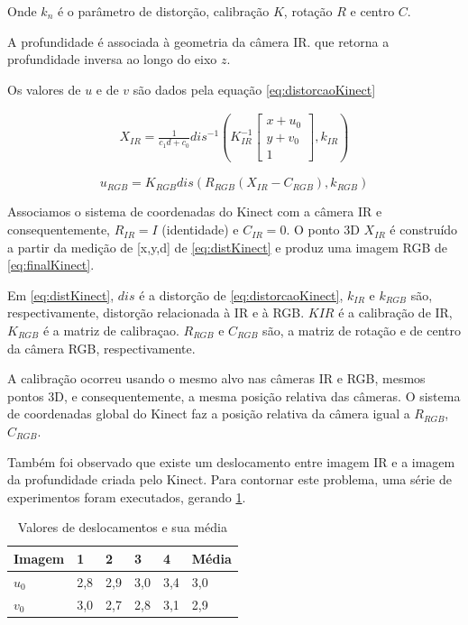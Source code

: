 Onde $k_n$ é o parâmetro de distorção, calibração $K$, rotação $R$ e centro $C$.

A profundidade é associada à geometria da câmera IR. que retorna a profundidade inversa ao longo do eixo $z$.

Os valores de $u$ e de $v$ são dados pela equação \ref{eq:distorcaoKinect} %

\begin{gather} 
X_{IR} = \frac{1}{c_1 d + c_0}dis^{-1}\left ( K^{-1}_{IR}
\begin{bmatrix}
x+u_0\\ 
y+v_0\\ 
1
\end{bmatrix},k_{IR} 
\right )
\label{eq:distKinect}
\end{gather}

\begin{equation}
\label{eq:finalKinect}
u_{RGB} = K_{RGB} dis(R_{RGB}(X_{IR} - C_{RGB}),k_{RGB})
\end{equation}

Associamos o sistema de coordenadas do Kinect com a câmera IR e consequentemente, $R_{IR} = I$ (identidade) e $C_{IR} = 0$. 
O ponto 3D $X_{IR}$ é construído a partir da medição de [x,y,d] de \ref{eq:distKinect} e produz uma imagem RGB de \ref{eq:finalKinect}.

Em \ref{eq:distKinect}, $dis$ é a distorção de \ref{eq:distorcaoKinect}, $k_{IR}$ e $k_{RGB}$ são, respectivamente, distorção relacionada à IR e à RGB. 
$K{IR}$ é a calibração de IR, $K_{RGB}$ é a matriz de calibraçao. $R_{RGB}$ e $C_{RGB}$ são, a matriz de rotação e de centro da câmera RGB, respectivamente.

A calibração ocorreu usando o mesmo alvo nas câmeras IR e RGB, mesmos pontos 3D, e consequentemente, a mesma posição relativa das câmeras.
O sistema de coordenadas global do Kinect faz a posição relativa da câmera igual a $R_{RGB}$, $C_{RGB}$.

Também foi observado que existe um deslocamento entre imagem IR e a imagem da profundidade criada pelo Kinect. Para contornar este problema, uma série de experimentos foram executados, gerando \ref{tab:deslocamentoKinect}.

\begin{table}[!h]
\centering
\caption{Valores de deslocamentos e sua média}
\label{tab:deslocamentoKinect}
\begin{tabular}{|l|l|l|l|l|l|}
\hline
Imagem & 1   & 2   & 3   & 4   & Média \\ \hline
$u_0$  & 2,8 & 2,9 & 3,0 & 3,4 & 3,0   \\ \hline
$v_0$  & 3,0 & 2,7 & 2,8 & 3,1 & 2,9   \\ \hline
\end{tabular}
\end{table}

